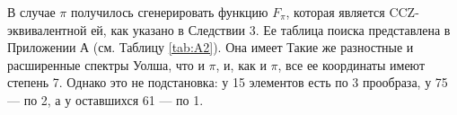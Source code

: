 В случае \(\pi\) получилось сгенерировать функцию \(F_\pi\), которая является CCZ-эквивалентной ей, как указано в Следствии 3. Ее таблица поиска представлена в Приложении А (см. Таблицу \ref{tab:A2}). Она имеет Такие же разностные и расширенные спектры Уолша, что и \(\pi\), и, как и \(\pi\), все ее координаты имеют степень 7. Однако это не подстановка: у 15 элементов есть по 3 прообраза, у 75 — по 2, а у оставшихся 61 — по 1.